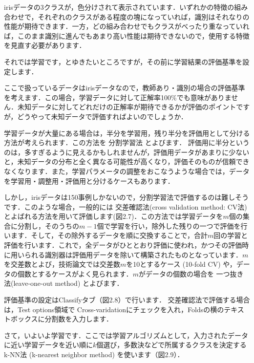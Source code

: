 
irisデータの3クラスが，色分けされて表示されています．いずれかの特徴の組み合わせで，それぞれのクラスがある程度の塊になっていれば，識別はそれなりの性能が期待できます．一方，どの組み合わせでもクラスがべったり重なっていれば，このまま識別に進んでもあまり高い性能は期待できないので，使用する特徴を見直す必要があります．


それでは学習です，とゆきたいところですが，その前に学習結果の評価基準を設定します．

ここで扱っているデータはirisデータなので，教師あり・識別の場合の評価基準を考えます．この場合，学習データに対して正解率100\%でも意味がありません．未知データに対してどれだけの正解率が期待できるかが評価のポイントですが，どうやって未知データで評価すればよいのでしょうか．

学習データが大量にある場合は，半分を学習用，残り半分を評価用として分ける方法が考えられます．この方法を
分割学習法
とよびます．
評価用に半分というのは，多すぎるように見えるかもしれませんが，評価用データがあまりに少ないと，未知データの分布と全く異なる可能性が高くなり，評価そのものが信頼できなくなります．また，学習パラメータの調整をおこなうような場合では，データを学習用・調整用・評価用と分けるケースもあります．

しかし，irisデータは150事例しかないので，分割学習法で評価するのは難しそうです．このような場合，一般的には
交差確認法(cross validation method: CV法)
とよばれる方法を用いて評価します(図2.7)．この方法では学習データを$m$個の集合に分割し，そのうちの$m-1$個で学習を行い，除外した残りの一つで評価を行います．そして，その除外するデータを順に交換することで，合計$m$回の学習と評価を行います．これで，全データがひととおり評価に使われ，かつその評価時に用いられる識別器は評価用データを除いて構築されたものとなっています．$m$を交差数とよび，技術論文では交差数$m$を10とするケース (10-fold CV) や，データの個数とするケースがよく見られます．$m$がデータの個数の場合を
一つ抜き法(leave-one-out method)
とよびます．




評価基準の設定はClassifyタブ（図2.8）で行います．
交差確認法で評価する場合は，Test options領域で Cross-varidationにチェックを入れ，Foldsの横のテキストボックスに分割数を入力します．



さて，いよいよ学習です．ここでは学習アルゴリズムとして，入力されたデータに近い学習データを近い順に$k$個選び，多数決などで所属するクラスを決定する
k-NN法 (k-nearest neighbor method) 
を使います（図2.9）．

